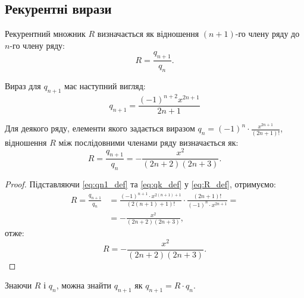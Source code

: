 	\subsection{Рекурентні вирази}
	
	\begin{definition}
		Рекурентний множник \( R \) визначається як відношення \( (n+1) \)-го члену ряду до \( n \)-го члену ряду:
		\begin{equation} \label{eq:R_def}
			R = \frac{q_{n+1}}{q_n}.
		\end{equation}
	\end{definition}
	
	\begin{definition}
		Вираз для \( q_{n+1} \) має наступний вигляд:
		\begin{equation} \label{eq:qn1_def}
			q_{n+1} = \frac{(-1)^{n+2} x^{2n+1}}{2n+1}
		\end{equation}
	\end{definition}
	
	\begin{theorem} \label{thm:ratio_test_result}
		Для деякого ряду, елементи якого задається виразом \(q_n = (-1)^n \cdot \frac{x^{2n+1}}{(2n + 1)!}\), відношення \(R\) між послідовними членами ряду визначається як:
		\[
		R = \frac{q_{n+1}}{q_n} = -\frac{x^2}{(2n + 2)(2n + 3)}.
		\]
	\end{theorem}
	
	\begin{proof}
		Підставляючи \eqref{eq:qn1_def} та \eqref{eq:qk_def} у \eqref{eq:R_def}, отримуємо:
		\begin{align*}
			R = \frac{q_{n+1}}{q_n} &= \frac{(-1)^{n+1} \cdot x^{2(n+1)+1}}{(2(n+1) + 1)!} \cdot \frac{(2n + 1)!}{(-1)^n \cdot x^{2n+1}}= \\
			&= -\frac{x^2}{(2n + 2)(2n + 3)},
		\end{align*}
		отже:
		\begin{equation} \label{eq:R_simplified}
			R = -\frac{x^2}{(2n + 2)(2n + 3)}.
		\end{equation}
	\end{proof}
	
	\begin{corollary}
		Знаючи \( R \) і \( q_n \), можна знайти \( q_{n+1} \) як \( q_{n+1} = R \cdot q_n \).
	\end{corollary}
	
	
	
	

	
	
	
